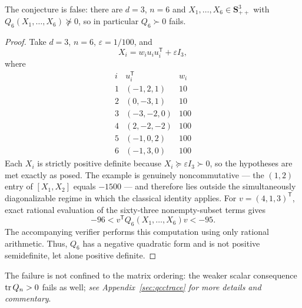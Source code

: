 \begin{cxrefutation}
\begin{theorem}\label{thm:quantum-coupon-collector}
The conjecture is false: there are $d=3$, $n=6$ and $X_1,\ldots,X_6\in\mathbf{S}_{++}^{3}$ with $Q_6(X_1,\ldots,X_6)\not\succeq0$, so in particular $Q_6\succ0$ fails.
\end{theorem}
\begin{proof}
Take $d=3$, $n=6$, $\varepsilon=1/100$, and
\[
X_i=w_iu_iu_i^{\mathsf T}+\varepsilon I_3,
\]
where
\[
\begin{array}{c|c|c}
i&u_i^{\mathsf T}&w_i\\\hline
1&(-1,2,1)&10\\
2&(0,-3,1)&10\\
3&(-3,-2,0)&100\\
4&(2,-2,-2)&100\\
5&(-1,0,2)&100\\
6&(-1,3,0)&100
\end{array}
\]
Each $X_i$ is strictly positive definite because $X_i\succeq\varepsilon I_3\succ0$, so the hypotheses are met exactly as posed.  The example is genuinely noncommutative --- the $(1,2)$ entry of $[X_1,X_2]$ equals $-1500$ --- and therefore lies outside the simultaneously diagonalizable regime in which the classical identity applies.  For $v=(4,1,3)^{\mathsf T}$, exact rational evaluation of the sixty-three nonempty-subset terms gives
\[
-96<v^{\mathsf T}Q_6(X_1,\ldots,X_6)v<-95.
\]
The accompanying verifier performs this computation using only rational arithmetic. Thus, $Q_6$ has a negative quadratic form and is not positive semidefinite, let alone positive definite.
\end{proof}

The failure is not confined to the matrix ordering: the weaker scalar consequence $\operatorname{tr} Q_n>0$ fails as well; \emph{see  Appendix~\ref{sec:qcctrace} for more details and commentary}.

\end{cxrefutation}


